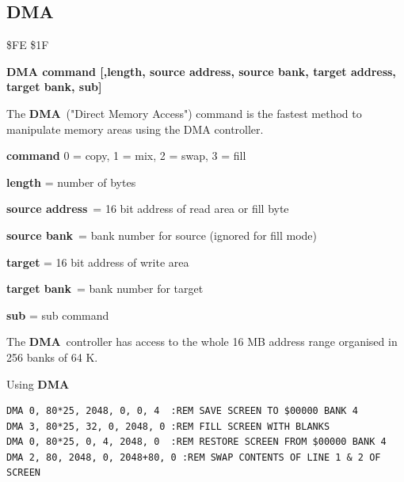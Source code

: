 \subsection{DMA}
\label{BASIC 65 Commands!DMA}
\begin{description}[leftmargin=2cm,style=nextline]
\item [Token:] \$FE \$1F
\item [Format:] {\bf DMA command [,length, source address,
                 source bank, target address, target bank, sub]}
\item [Usage:]
   The {\bf DMA} ("Direct Memory Access") command is the fastest method
   to manipulate memory areas using the DMA controller.

   {\bf command} 0 = copy, 1 = mix, 2 = swap, 3 = fill

   {\bf length} = number of bytes

   {\bf source address} = 16 bit address of read area or fill byte

   {\bf source bank} = bank number for source (ignored for fill mode)

   {\bf target} = 16 bit address of write area

   {\bf target bank} = bank number for target

   {\bf sub} = sub command

\item [Remarks:]
The {\bf DMA} controller has access to the whole 16 MB address range
organised in 256 banks of 64 K.
\item [Example:] Using {\bf DMA}
\begin{tcolorbox}[colback=black,coltext=white]
\verbatimfont{\codefont}
\begin{verbatim}
DMA 0, 80*25, 2048, 0, 0, 4  :REM SAVE SCREEN TO $00000 BANK 4
DMA 3, 80*25, 32, 0, 2048, 0 :REM FILL SCREEN WITH BLANKS
DMA 0, 80*25, 0, 4, 2048, 0  :REM RESTORE SCREEN FROM $00000 BANK 4
DMA 2, 80, 2048, 0, 2048+80, 0 :REM SWAP CONTENTS OF LINE 1 & 2 OF SCREEN
\end{verbatim}
\end{tcolorbox}
\end{description}


\newpage
